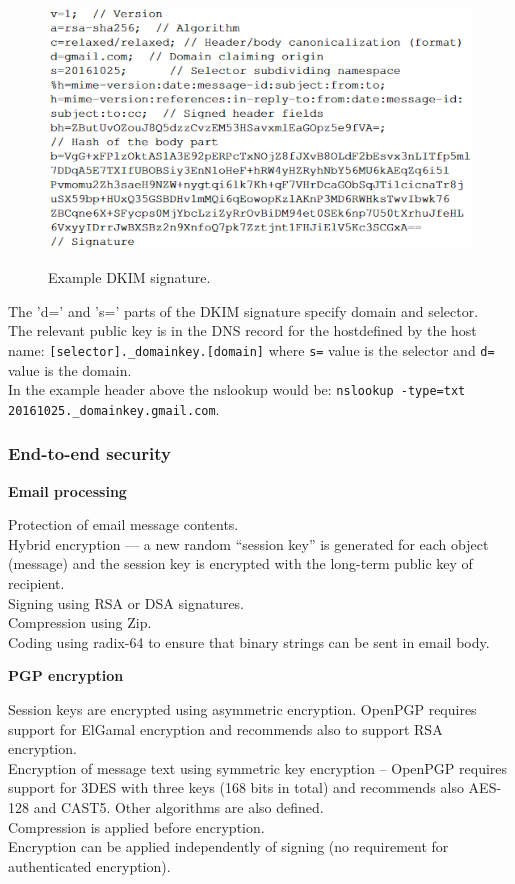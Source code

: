 \documentclass{article}
\begin{document}
\begin{figure}[H]
\begin{center}
\includegraphics[scale=0.59]{Images/exampledkimsignature.png}
\label{fig:fround}
\caption{Example DKIM signature.}
\end{center}
\end{figure}

The ’d=’ and ’s=’ parts of the DKIM signature specify domain and selector.\\
The relevant public key is in the DNS record for the hostdefined by the host name: \texttt{[selector].\_domainkey.[domain]} where \texttt{s=} value is the selector and \texttt{d=} value is the domain.\\
In the example header above the nslookup would be: \texttt{nslookup -type=txt 20161025.\_domainkey.gmail.com}.

\subsubsection{End-to-end security}

\textbf{Email processing}

Protection of email message contents.\\
Hybrid encryption — a new random “session key” is generated for each object (message) and the session key is encrypted with the long-term public key of recipient.\\
Signing using RSA or DSA signatures.\\
Compression using Zip.\\
Coding using radix-64 to ensure that binary strings can be sent in email body.

\textbf{PGP encryption}

Session keys are encrypted using asymmetric encryption. OpenPGP requires support for ElGamal encryption and recommends also to support RSA encryption.\\
Encryption of message text using symmetric key encryption – OpenPGP requires support for 3DES with three keys (168 bits in total) and recommends also AES-128 and CAST5. Other algorithms are also defined.\\
Compression is applied before encryption.\\
Encryption can be applied independently of signing (no requirement for authenticated encryption).
\end{document}
